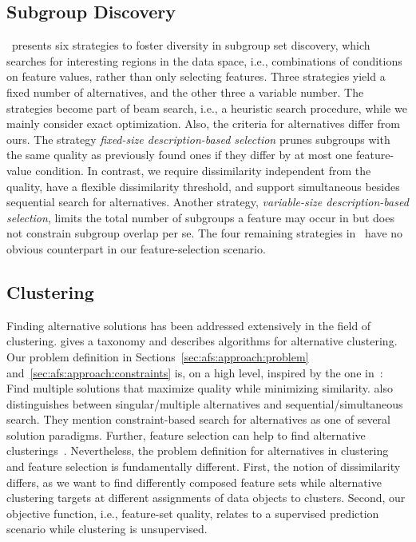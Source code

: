 \documentclass{article}
\theoremstyle{definition}
\begin{document}
\subsection{Subgroup Discovery}
\label{sec:afs:related-work:subgroup-discovery}

\cite{leeuwen2012diverse}~presents six strategies to foster diversity in subgroup set discovery, which searches for interesting regions in the data space, i.e., combinations of conditions on feature values, rather than only selecting features.
Three strategies yield a fixed number of alternatives, and the other three a variable number.
The strategies become part of beam search, i.e., a heuristic search procedure, while we mainly consider exact optimization.
Also, the criteria for alternatives differ from ours.
The strategy \emph{fixed-size description-based selection} prunes subgroups with the same quality as previously found ones if they differ by at most one feature-value condition.
In contrast, we require dissimilarity independent from the quality, have a flexible dissimilarity threshold, and support simultaneous besides sequential search for alternatives.
Another strategy, \emph{variable-size description-based selection}, limits the total number of subgroups a feature may occur in but does not constrain subgroup overlap per se.
The four remaining strategies in~\cite{leeuwen2012diverse} have no obvious counterpart in our feature-selection scenario.

\subsection{Clustering}
\label{sec:afs:related-work:clustering}

Finding alternative solutions has been addressed extensively in the field of clustering.
\cite{bailey2014alternative} gives a taxonomy and describes algorithms for alternative clustering.
Our problem definition in Sections~\ref{sec:afs:approach:problem} and~\ref{sec:afs:approach:constraints} is, on a high level, inspired by the one in~\cite{bailey2014alternative}:
Find multiple solutions that maximize quality while minimizing similarity.
\cite{bailey2014alternative} also distinguishes between singular/multiple alternatives and sequential/simultaneous search.
They mention constraint-based search for alternatives as one of several solution paradigms.
Further, feature selection can help to find alternative clusterings~\cite{tao2012novel}.
Nevertheless, the problem definition for alternatives in clustering and feature selection is fundamentally different.
First, the notion of dissimilarity differs, as we want to find differently composed feature sets while alternative clustering targets at different assignments of data objects to clusters.
Second, our objective function, i.e., feature-set quality, relates to a supervised prediction scenario while clustering is unsupervised.
\end{document}
